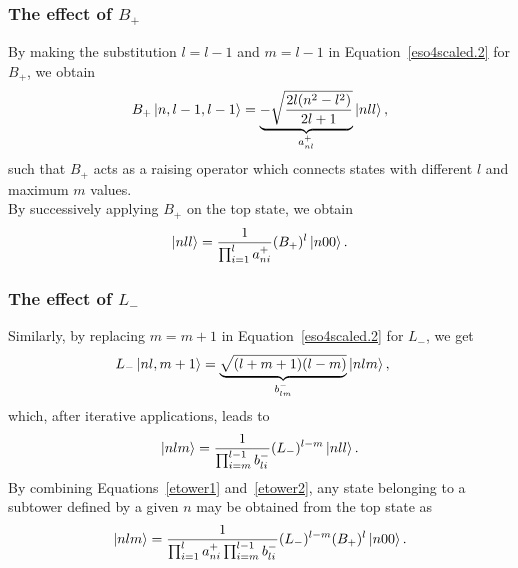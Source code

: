 \documentclass[12pt,a4paper]{report}
\theoremstyle{definition}
\theoremstyle{remark}
\theoremstyle{remark}
\begin{document}
\subsubsection{The effect of $B_+$}
By making the substitution $l=l-1$ and $m=l-1$ in Equation~\ref{eso4scaled.2} for $B_+$, we obtain
\begin{align*}
B_+\ket{n,l-1,l-1}=\underbrace{-\sqrt{\frac{2l(n^2-l^2)}{2l+1}}}_{a^+_{nl}}\ket{nll},
\end{align*}
such that $B_+$ acts as a raising operator which connects states with different $l$ and maximum $m$ values.\\ \indent
By successively applying $B_+$ on the top state, we obtain
\begin{equation}\label{etower1}
\ket{nll}=\frac{1}{\prod_{i=1}^la^+_{ni}}(B_+)^l\ket{n00}.
\end{equation}

\subsubsection{The effect of $L_-$}
Similarly, by replacing $m=m+1$ in Equation~\ref{eso4scaled.2} for $L_-$, we get
\begin{align*}
L_-\ket{nl,m+1}&=\underbrace{\sqrt{(l+m+1)(l-m)}}_{b^-_{lm}}\ket{nlm},
\end{align*}
which, after iterative applications, leads to
\begin{equation}\label{etower2}
\ket{nlm}=\frac{1}{\prod_{i=m}^{l-1}b^-_{li}}(L_-)^{l-m}\ket{nll}.
\end{equation}
By combining Equations~\ref{etower1} and~\ref{etower2}, any state belonging to a subtower defined by a given $n$ may be obtained from the top state as
\begin{equation}\label{etower3}
\ket{nlm}=\frac{1}{\prod_{i=1}^la^+_{ni}\prod_{i=m}^{l-1}b^-_{li}}(L_-)^{l-m}(B_+)^l\ket{n00}.
\end{equation}
\end{document}
